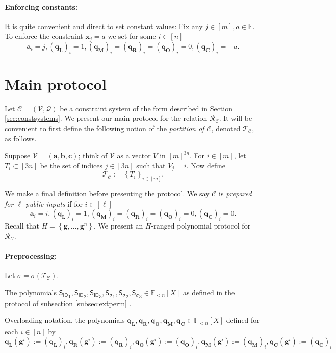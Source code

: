 \documentclass[11pt]{article} %
\newcommand{\F}{\ensuremath{\mathbb F}\xspace}
\newcommand{\sigof}[1]{\ensuremath{\sigma(#1)}\xspace}
\newcommand{\defeq}{:=}
\newcommand{\dom}{\ensuremath{H}\xspace}
\newcommand{\partition}{\ensuremath{{\mathcal T}}\xspace}
\newcommand{\partof}[1]{\ensuremath{{\partition_{#1}}}\xspace}
\newcommand{\sett}[2]{\ensuremath{\set{#1}_{#2}}\xspace}
\newcommand{\rel}{\ensuremath{\mathcal{R}}\xspace}
\newcommand{\set}[1]{\ensuremath{\left\{#1\right\}}\xspace}
\newcommand{\hgen}{\ensuremath{\mathbf{g}}\xspace}
\newcommand{\polysofdeg}[1]{\ensuremath{\F_{< #1}[X]}\xspace}
\newcommand{\sigpoly}{\ensuremath{\mathsf{S_{\sigma}}}\xspace}
\newcommand{\idpoly}{\ensuremath{\mathsf{S_{ID}}}\xspace}
\newcommand{\selleft}{\ensuremath{\mathbf{q_L}}\xspace}
\newcommand{\selright}{\ensuremath{\mathbf{q_R}}\xspace}
\newcommand{\selout}{\ensuremath{\mathbf{q_O}}\xspace}
\newcommand{\selmult}{\ensuremath{\mathbf{q_M}}\xspace}
\newcommand{\selconst}{\ensuremath{\mathbf{q_C}}\xspace}
\newcommand{\selectors}{\ensuremath{\mathcal{Q}}\xspace}
\newcommand{\lvar}{\ensuremath{\mathbf{a}}\xspace}
\newcommand{\vars}{\ensuremath{\mathcal{V}}\xspace}
\newcommand{\rvar}{\ensuremath{\mathbf{b}}\xspace}
\newcommand{\ovar}{\ensuremath{\mathbf{c}}\xspace}
\newcommand{\assignment}{\ensuremath{\mathbf{x}}\xspace}
\newcommand{\constsystem}{\ensuremath{\mathscr{C}}\xspace}
\newcommand{\relof}[1]{\ensuremath{\rel_{#1}}\xspace}
\begin{document}
\paragraph{Enforcing constants:}
It is quite convenient and direct to set constant values: Fix any $j\in [m], a\in \F$.  To enforce the constraint $\assignment_j = a$ we set  for some $i\in [n]$
\[\lvar_i=j,    (\selleft)_i=1 ,(\selmult)_i= (\selright)_i=(\selout)_i = 0 , (\selconst)_i =-a.\]  





\section{Main protocol}
Let $\constsystem=(\vars,\selectors)$ be a constraint system of the form described in Section \ref{sec:constsystems}.
We present our main protocol for the relation \relof{\constsystem}.
It will be convenient to first define the following notion of the \emph{partition of \constsystem}, denoted $\partof{\constsystem}$, as follows.

Suppose $\vars=(\lvar,\rvar,\ovar)$; think of \vars as a vector $V$ in $[m]^{3n}$.
For $i\in [m]$, let $T_i\subset [3n]$ be the set of indices $j\in [3n]$ such that $V_j=i$.
Now define 
\[\partof{\constsystem}\defeq \sett{T_i}{i\in [m]}.\]


We make a final definition before presenting the protocol.
We say \constsystem is \emph{prepared for $\ell$ public inputs} if for $i\in [\ell]$ 
\[\lvar_i=i,    (\selleft)_i=1 ,(\selmult)_i= (\selright)_i=(\selout)_i = 0 , (\selconst)_i =0.\]  
\noindent
Recall that $\dom=\set{\hgen,\ldots,\hgen^n}$.
We present an \dom-ranged polynomial protocol for \relof{\constsystem}.

\paragraph{Preprocessing:}
Let $\sigma = \sigof{\partof{\constsystem}}$.

The polynomials $\idpoly_1,\idpoly_2,\idpoly_3, \sigpoly_1,\sigpoly_2,\sigpoly_3\in \polysofdeg{n}$ as defined in the protocol of subsection \ref{subsec:extperm} .

Overloading notation, the polynomials $\selleft,\selright,\selout,\selmult,\selconst\in \polysofdeg{n}$ defined for each $i\in [n]$ by
\[\selleft(\hgen^i)\defeq(\selleft)_i,\selright(\hgen^i)\defeq (\selright)_i,\selout(\hgen^i)\defeq (\selout)_i,\selmult(\hgen^i)\defeq (\selmult)_i,\selconst(\hgen^i)\defeq (\selconst)_i\]
\end{document}
